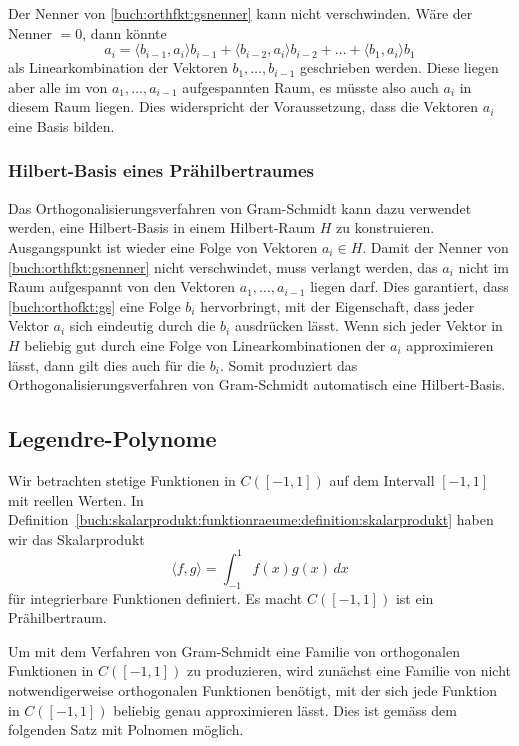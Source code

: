 Der Nenner von \eqref{buch:orthfkt:gsnenner} kann nicht verschwinden.
Wäre der Nenner $=0$, dann könnte
\[
a_i
=
\langle b_{i-1},a_i\rangle b_{i-1} + \langle b_{i-2},a_i\rangle b_{i-2}
+ \dots + \langle b_1,a_i\rangle b_1
\]
als Linearkombination der Vektoren $b_1,\dots,b_{i-1}$ geschrieben
werden.
Diese liegen aber alle im von $a_1,\dots,a_{i-1}$ aufgespannten Raum,
es müsste also auch $a_i$ in diesem Raum liegen.
Dies widerspricht der Voraussetzung, dass die Vektoren $a_i$ eine Basis
bilden.

%
%
\subsubsection{Hilbert-Basis eines Prähilbertraumes}
Das Orthogonalisierungsverfahren von Gram-Schmidt kann dazu verwendet
werden, eine Hilbert-Basis in einem Hilbert-Raum $H$ zu konstruieren.
Ausgangspunkt ist wieder eine Folge von Vektoren $a_i\in H$.
Damit der Nenner von \eqref{buch:orthfkt:gsnenner} nicht verschwindet,
muss verlangt werden, das $a_i$ nicht im Raum aufgespannt von den
Vektoren $a_1,\dots,a_{i-1}$ liegen darf.
Dies garantiert, dass \eqref{buch:orthofkt:gs} eine Folge $b_i$ hervorbringt,
mit der Eigenschaft, dass jeder Vektor $a_i$ sich eindeutig durch die
$b_i$ ausdrücken lässt.
Wenn sich jeder Vektor in $H$ beliebig gut durch eine Folge von
Linearkombinationen der $a_i$ approximieren lässt, dann gilt dies auch
für die $b_i$.
Somit produziert das Orthogonalisierungsverfahren von Gram-Schmidt
automatisch eine Hilbert-Basis.

%
%
\subsection{Legendre-Polynome}
Wir betrachten stetige Funktionen in $C([-1,1])$ auf dem Intervall
$[-1,1]$ mit reellen Werten.
In Definition~\ref{buch:skalarprodukt:funktionraeume:definition:skalarprodukt}
haben wir das Skalarprodukt
\[
\langle f,g\rangle
=
\int_{-1}^1 f(x)g(x)\,dx
\]
für integrierbare Funktionen definiert.
Es macht $C([-1,1])$ ist ein Prähilbertraum.

Um mit dem Verfahren von Gram-Schmidt eine Familie von orthogonalen
Funktionen in $C([-1,1])$ zu produzieren, wird zunächst eine Familie
von nicht notwendigerweise orthogonalen Funktionen benötigt, mit der
sich jede Funktion in $C([-1,1])$ beliebig genau approximieren
lässt.
Dies ist gemäss dem folgenden Satz mit Polnomen möglich.

